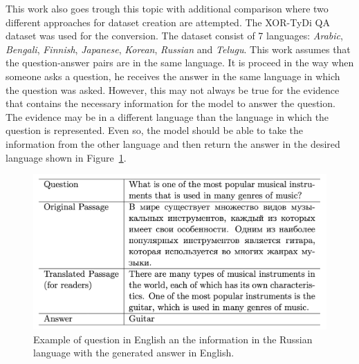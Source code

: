 This work also goes trough this topic with additional comparison where two different approaches for dataset creation are attempted. The XOR-TyDi QA dataset was used for the conversion. The dataset consist of 7 languages: \emph{Arabic}, \emph{Bengali}, \emph{Finnish}, \emph{Japanese}, \emph{Korean}, \emph{Russian} and \emph{Telugu}. This work assumes that the question-answer pairs are in the same language. It is proceed in the way when someone asks a question, he receives the answer in the same language in which the question was asked. However, this may not always be true for the evidence that contains the necessary information for the model to answer the question. The evidence may be in a different language than the language in which the question is represented. Even so, the model should be able to take the information from the other language and then return the answer in the desired language shown in Figure~\ref{fig:other_language}.

\begin{figure}[H]
    \centering
    \includegraphics[scale=0.2]{figures/example1.png}
    \caption{Example of question in English an the information in the Russian language with the generated answer in English.}
    \label{fig:other_language}
\end{figure}


